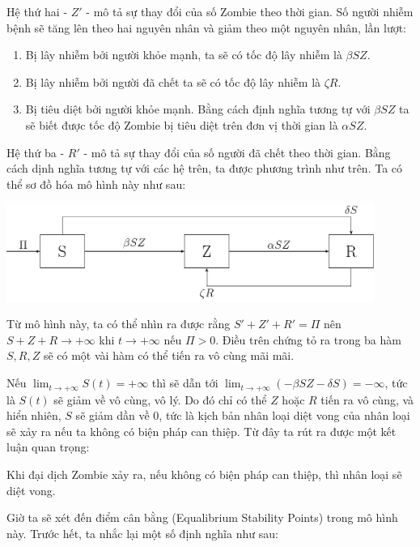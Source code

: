 \documentclass[12pt]{scrartcl}
\begin{document}
Hệ thứ hai - $Z'$ - mô tả sự thay đổi của số Zombie theo thời gian. Số người nhiễm bệnh sẽ tăng lên theo hai nguyên nhân và giảm theo một nguyên nhân, lần lượt: 
\begin{enumerate}
    \item Bị lây nhiễm bởi người khỏe mạnh, ta sẽ có tốc độ lây nhiễm là $\beta S Z$.
    \item Bị lây nhiễm bởi người đã chết ta sẽ có tốc độ lây nhiễm là $\zeta R$.
    \item Bị tiêu diệt bởi người khỏe mạnh. Bằng cách định nghĩa tương tự với $\beta SZ$ ta sẽ biết được tốc độ Zombie bị tiêu diệt trên đơn vị thời gian là $\alpha SZ$.
\end{enumerate}
Hệ thứ ba - $R'$ - mô tả sự thay đổi của số người đã chết theo thời gian. Bằng cách dịnh nghĩa tương tự với các hệ trên, ta được phương trình như trên. Ta có thể sơ đồ hóa mô hình này như sau:
\begin{center}
    \includegraphics[width=0.9\textwidth]{SRZ.pdf}
\end{center}
Từ mô hình này, ta có thể nhìn ra được rằng $S' + Z' + R' = \Pi$ nên $S + Z + R \to +\infty$ khi $t \to +\infty$ nếu $\Pi > 0$.
Điều trên chứng tỏ ra trong ba hàm $S,R,Z$ sẽ có một vài hàm có thể tiến ra vô cùng mãi mãi. 
 
Nếu $\displaystyle\lim_{t \to +\infty}S(t) = +\infty$ thì sẽ dẫn tới $\displaystyle\lim_{t \to +\infty}( - \beta SZ - \delta S )= -\infty$, tức là $S(t)$ sẽ giảm về vô cùng, vô lý. Do đó chỉ có thể $Z$ hoặc $R$ tiến ra vô cùng, và hiển nhiên, $S$ sẽ giảm dần về $0$, tức là kịch bản nhân loại diệt vong của nhân loại sẽ xảy ra nếu ta không có biện pháp can thiệp. Từ đây ta rút ra được một kết luận quan trọng:

\begin{theorem}
    Khi đại dịch Zombie xảy ra, nếu không có biện pháp can thiệp, thì nhân loại sẽ diệt vong.
\end{theorem}

Giờ ta sẽ xét đến điểm cân bằng (Equalibrium Stability Points) trong mô hình này. Trước hết, ta nhắc lại một số định nghĩa như sau:
\end{document}
